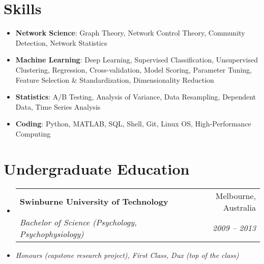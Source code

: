 \documentclass[letterpaper,10pt]{article}
\makeatletter
\newcommand{\resumeSubheading}[4]{
  \vspace{-1pt}\item
    \begin{tabular*}{0.97\textwidth}[t]{l@{\extracolsep{\fill}}r}
      \textbf{#1} & #2 \\
      \textit{\small#3} & \textit{\small #4} \\
    \end{tabular*}\vspace{-5pt}
}
\newcommand{\resumeSubHeadingListStart}{\begin{itemize}[leftmargin=*]}
\newcommand{\resumeSubHeadingListEnd}{\end{itemize}}
\makeatother
\begin{document}
\section{Skills}
 \resumeSubHeadingListStart
   \item{
    \textbf{Network Science}{: Graph Theory, Network Control Theory, Community Detection, Network Statistics}
    }
   \item{
    \textbf{Machine Learning}{: Deep Learning, Supervised Classification, Unsupervised Clustering, Regression, Cross-validation, Model Scoring, Parameter Tuning, Feature Selection \& Standardization, Dimensionality Reduction}
    }
   \item{
    \textbf{Statistics}{: A/B Testing, Analysis of Variance, Data Resampling, Dependent Data, Time Series Analysis}
    }
   \item{
    \textbf{Coding}{: Python, MATLAB, SQL, Shell, Git, Linux OS, High-Performance Computing}
    }
 \resumeSubHeadingListEnd

\section{Undergraduate Education}
  \resumeSubHeadingListStart
    \resumeSubheading
      {Swinburne University of Technology}{Melbourne, Australia}
      {Bachelor of Science (Psychology, Psychophysiology)}{2009 -- 2013}
      \item[] \textit{Honours (capstone research project), First Class, Dux (top of the class)}
  \resumeSubHeadingListEnd
\end{document}

